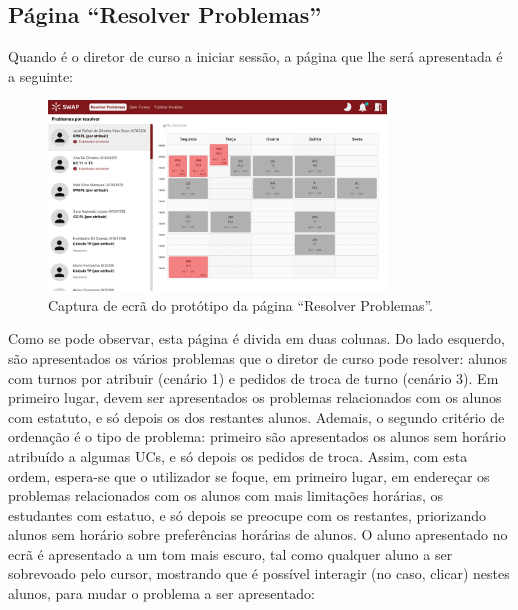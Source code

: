 \documentclass[12pt, a4paper]{article}
\begin{document}
\subsection{Página ``Resolver Problemas''}

Quando é o diretor de curso a iniciar sessão, a página que lhe será apresentada é a seguinte:

\begin{figure}[H]
    \centering
    \includegraphics[width=0.8\textwidth]{res/prototype/resolver-problemas.png}
    \caption{Captura de ecrã do protótipo da página ``Resolver Problemas''.}
    \label{resolver-problemas}
\end{figure}

Como se pode observar, esta página é divida em duas colunas. Do lado esquerdo, são apresentados os
vários problemas que o diretor de curso pode resolver: alunos com turnos por atribuir (cenário 1) e
pedidos de troca de turno (cenário 3). Em primeiro lugar, devem ser apresentados os problemas
relacionados com os alunos com estatuto, e só depois os dos restantes alunos. Ademais, o segundo
critério de ordenação é o tipo de problema: primeiro são apresentados os alunos sem horário
atribuído a algumas UCs, e só depois os pedidos de troca. Assim, com esta ordem, espera-se que o
utilizador se foque, em primeiro lugar, em endereçar os problemas relacionados com os alunos com
mais limitações horárias, os estudantes com estatuo, e só depois se preocupe com os restantes,
priorizando alunos sem horário sobre preferências horárias de alunos. O aluno apresentado no ecrã é
apresentado a um tom mais escuro, tal como qualquer aluno a ser sobrevoado pelo cursor, mostrando
que é possível interagir (no caso, clicar) nestes alunos, para mudar o problema a ser apresentado:
\end{document}
